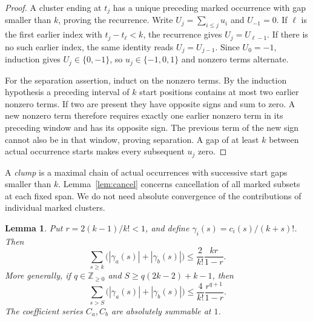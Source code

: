 \documentclass[11pt]{amsart}
\newtheorem{lemma}[theorem]{Lemma}
\theoremstyle{remark}
\begin{document}
\begin{proof}
A cluster ending at $t_j$ has a unique preceding marked occurrence with gap smaller than $k$, proving the recurrence. Write $U_j=\sum_{i\le j}u_i$ and $U_{-1}=0$. If $\ell$ is the first earlier index with $t_j-t_\ell<k$, the recurrence gives $U_j=U_{\ell-1}$. If there is no such earlier index, the same identity reads $U_j=U_{j-1}$. Since $U_0=-1$, induction gives $U_j\in\{0,-1\}$, so $u_j\in\{-1,0,1\}$ and nonzero terms alternate.

For the separation assertion, induct on the nonzero terms. By the induction hypothesis a preceding interval of $k$ start positions contains at most two earlier nonzero terms. If two are present they have opposite signs and sum to zero. A new nonzero term therefore requires exactly one earlier nonzero term in its preceding window and has its opposite sign. The previous term of the new sign cannot also be in that window, proving separation. A gap of at least $k$ between actual occurrence starts makes every subsequent $u_j$ zero.
\end{proof}

A \emph{clump} is a maximal chain of actual occurrences with successive start gaps smaller than $k$. Lemma~\ref{lem:cancel} concerns cancellation of all marked subsets at each fixed span. We do not need absolute convergence of the contributions of individual marked clusters.

\begin{lemma}\label{lem:tail}
Put $r=2(k-1)/k!<1$, and define $\gamma_i(s)=c_i(s)/(k+s)!$. Then
\begin{equation}\label{eq:coarsetail}
 \sum_{s\ge k}\bigl(|\gamma_a(s)|+|\gamma_b(s)|\bigr)
 \le \frac{2}{k!}\frac{kr}{1-r}.
\end{equation}
More generally, if $q\in\mathbb Z_{\ge0}$ and $S\ge q(2k-2)+k-1$, then
\begin{equation}\label{eq:finetail}
 \sum_{s>S}\bigl(|\gamma_a(s)|+|\gamma_b(s)|\bigr)
 \le \frac{4}{k!}\frac{r^{q+1}}{1-r}.
\end{equation}
The coefficient series $C_a,C_b$ are absolutely summable at $1$.
\end{lemma}
\end{document}
